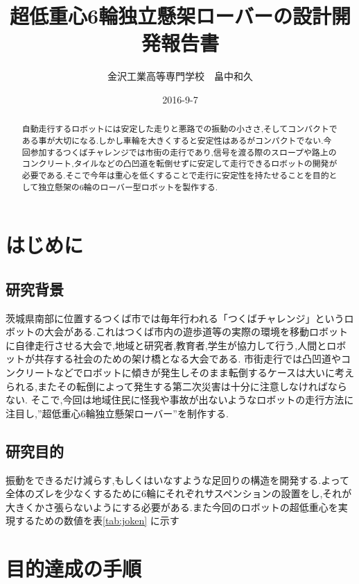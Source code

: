\documentclass[11pt]{jsarticle}
\title{超低重心6輪独立懸架ローバーの設計開発報告書}
\author{金沢工業高等専門学校　畠中和久}
\date{2016-9-7}
\begin{document}
\maketitle
\begin{abstract}
自動走行するロボットには安定した走りと悪路での振動の小ささ,そしてコンパクトである事が大切になる.しかし車輪を大きくすると安定性はあるがコンパクトでない.今回参加するつくばチャレンジでは市街の走行であり,信号を渡る際のスロープや路上のコンクリート,タイルなどの凸凹道を転倒せずに安定して走行できるロボットの開発が必要である.そこで今年は重心を低くすることで走行に安定性を持たせることを目的として独立懸架の6輪のローバー型ロボットを製作する.
\end{abstract}

\tableofcontents
\section{はじめに}
\subsection{研究背景}
茨城県南部に位置するつくば市では毎年行われる「つくばチャレンジ」というロボットの大会がある.これはつくば市内の遊歩道等の実際の環境を移動ロボットに自律走行させる大会で,地域と研究者,教育者,学生が協力して行う,人間とロボットが共存する社会のための架け橋となる大会である. 
市街走行では凸凹道やコンクリートなどでロボットに傾きが発生しそのまま転倒するケースは大いに考えられる,またその転倒によって発生する第二次災害は十分に注意しなければならない.
そこで,今回は地域住民に怪我や事故が出ないようなロボットの走行方法に注目し,”超低重心6輪独立懸架ローバー”を制作する.




\subsection{研究目的}
振動をできるだけ減らす,もしくはいなすような足回りの構造を開発する.よって全体のズレを少なくするために6輪にそれぞれサスペンションの設置をし,それが大きくかさ張らないようにする必要がある.また今回のロボットの超低重心を実現するための数値を表\ref{tab:joken} に示す


\section{目的達成の手順}
\end{document}
